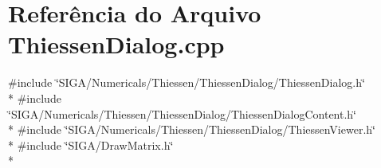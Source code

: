 \section{Referência do Arquivo Thiessen\+Dialog.\+cpp}
\label{_thiessen_dialog_8cpp}
{\ttfamily \#include \char`\"{}S\+I\+G\+A/\+Numericals/\+Thiessen/\+Thiessen\+Dialog/\+Thiessen\+Dialog.\+h\char`\"{}}\\*
{\ttfamily \#include \char`\"{}S\+I\+G\+A/\+Numericals/\+Thiessen/\+Thiessen\+Dialog/\+Thiessen\+Dialog\+Content.\+h\char`\"{}}\\*
{\ttfamily \#include \char`\"{}S\+I\+G\+A/\+Numericals/\+Thiessen/\+Thiessen\+Dialog/\+Thiessen\+Viewer.\+h\char`\"{}}\\*
{\ttfamily \#include \char`\"{}S\+I\+G\+A/\+Draw\+Matrix.\+h\char`\"{}}\\*
